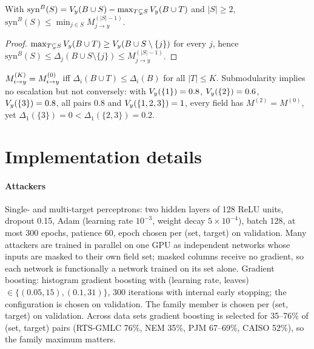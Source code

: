 \begin{proposition}\label{prop:syn}
With $\mathrm{syn}^B(S)=V_{y}(B\cup S)-\max_{T\subsetneq S}V_{y}(B\cup T)$ and $|S|\ge 2$,
$\mathrm{syn}^B(S)\le\min_{j\in S}M^{(|S|-1)}_{j\to y}$.
\end{proposition}
\begin{proof}
$\max_{T\subsetneq S}V_{y}(B\cup T)\ge V_{y}(B\cup S\setminus\{j\})$ for every $j$, hence
$\mathrm{syn}^B(S)\le\Delta_j(B\cup S\setminus\{j\})\le M^{(|S|-1)}_{j\to y}$.
\end{proof}

\begin{remark}
$M^{(K)}_{i \to y}=M^{(0)}_{i\to y}$ iff $\Delta_i(B\cup T)\le\Delta_i(B)$ for all $|T|\le K$. Submodularity implies no
escalation but not conversely: with $V_{y}(\{1\})=0.8$, $V_{y}(\{2\})=0.6$, $V_{y}(\{3\})=0.8$, all pairs $0.8$
and $V_{y}(\{1,2,3\})=1$, every field has $M^{(2)}=M^{(0)}$, yet $\Delta_1(\{3\})=0<\Delta_1(\{2,3\})=0.2$.
\end{remark}

\section{Implementation details}\label{app:impl}

\paragraph{Attackers} Single- and multi-target perceptrons: two hidden layers of 128 ReLU units,
dropout 0.15, Adam (learning rate $10^{-3}$, weight decay $5\times10^{-4}$), batch 128, at most 300
epochs, patience 60, epoch chosen per (set, target) on validation. Many attackers are trained in
parallel on one GPU as independent networks whose inputs are masked to their own field set; masked
columns receive no gradient, so each network is functionally a network trained on its set alone.
Gradient boosting: histogram gradient boosting with (learning rate, leaves) $\in\{(0.05,15),(0.1,31)\}$,
300 iterations with internal early stopping; the configuration is chosen on validation. The family
member is chosen per (set, target) on validation. Across data sets gradient boosting is selected for
35--76\% of (set, target) pairs (RTS-GMLC 76\%, NEM 35\%, PJM 67--69\%, CAISO 52\%), so the family maximum matters.

